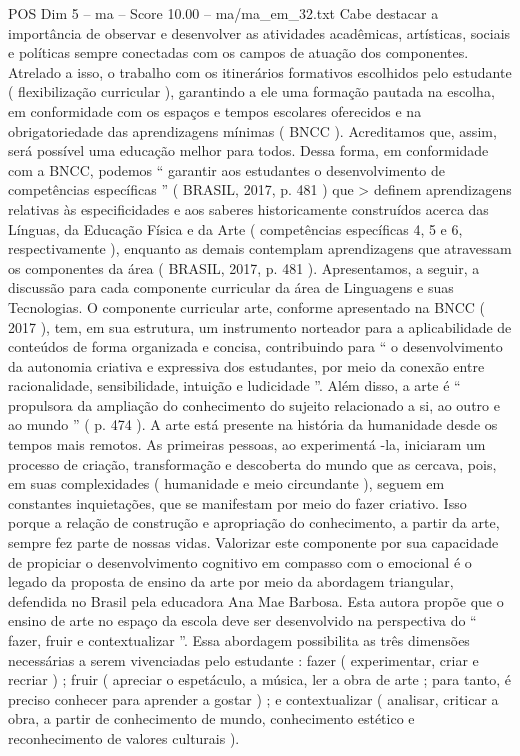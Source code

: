 \begin{textsample}{POS Dim 5 – ma – Score 10.00 – ma/ma\_em\_32.txt}
Cabe destacar a importância de observar e desenvolver as atividades acadêmicas, artísticas, sociais e políticas sempre conectadas com os campos de atuação dos componentes.
Atrelado a isso, o trabalho com os itinerários formativos escolhidos pelo estudante ( flexibilização curricular ), garantindo a ele uma formação pautada na escolha, em conformidade com os espaços e tempos escolares oferecidos e na obrigatoriedade das aprendizagens mínimas ( BNCC ).
Acreditamos que, assim, será possível uma educação melhor para todos.
Dessa forma, em conformidade com a BNCC, podemos “ garantir aos estudantes o desenvolvimento de competências específicas ” ( BRASIL, 2017, p. 481 ) que > definem aprendizagens relativas às especificidades e aos saberes historicamente construídos acerca das Línguas, da Educação Física e da Arte ( competências específicas 4, 5 e 6, respectivamente ), enquanto as demais contemplam aprendizagens que atravessam os componentes da área ( BRASIL, 2017, p. 481 ).
Apresentamos, a seguir, a discussão para cada componente curricular da área de Linguagens e suas Tecnologias.
O componente curricular arte, conforme apresentado na BNCC ( 2017 ), tem, em sua estrutura, um instrumento norteador para a aplicabilidade de conteúdos de forma organizada e concisa, contribuindo para “ o desenvolvimento da autonomia criativa e expressiva dos estudantes, por meio da conexão entre racionalidade, sensibilidade, intuição e ludicidade ”.
Além disso, a arte é “ propulsora da ampliação do conhecimento do sujeito relacionado a si, ao outro e ao mundo ” ( p. 474 ).
A arte está presente na história da humanidade desde os tempos mais remotos.
As primeiras pessoas, ao experimentá -la, iniciaram um processo de criação, transformação e descoberta do mundo que as cercava, pois, em suas complexidades ( humanidade e meio circundante ), seguem em constantes inquietações, que se manifestam por meio do fazer criativo.
Isso porque a relação de construção e apropriação do conhecimento, a partir da arte, sempre fez parte de nossas vidas.
Valorizar este componente por sua capacidade de propiciar o desenvolvimento cognitivo em compasso com o emocional é o legado da proposta de ensino da arte por meio da abordagem triangular, defendida no Brasil pela educadora Ana Mae Barbosa.
Esta autora propõe que o ensino de arte no espaço da escola deve ser desenvolvido na perspectiva do “ fazer, fruir e contextualizar ”.
Essa abordagem possibilita as três dimensões necessárias a serem vivenciadas pelo estudante : fazer ( experimentar, criar e recriar ) ; fruir ( apreciar o espetáculo, a música, ler a obra de arte ; para tanto, é preciso conhecer para aprender a gostar ) ; e contextualizar ( analisar, criticar a obra, a partir de conhecimento de mundo, conhecimento estético e reconhecimento de valores culturais ).

\end{textsample}
